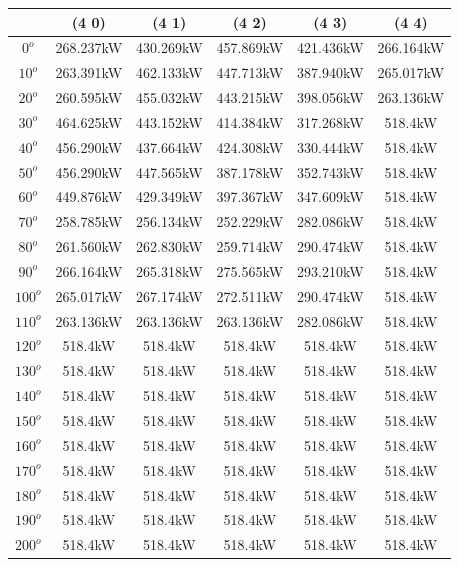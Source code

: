        \begin{table}[H]
        	\centering
        	\begin{tabular}{|c|c|c|c|c|c|} \hline
        			& (4 0)		& (4 1)		& (4 2)		& (4 3)		& (4 4)		\\ \hline
		$0^o$	& 268.237kW	& 430.269kW	& 457.869kW	& 421.436kW	& 266.164kW	\\ \hline
		$10^o$	& 263.391kW	& 462.133kW	& 447.713kW	& 387.940kW	& 265.017kW	\\ \hline
		$20^o$	& 260.595kW	& 455.032kW	& 443.215kW	& 398.056kW	& 263.136kW	\\ \hline
		$30^o$	& 464.625kW	& 443.152kW	& 414.384kW	& 317.268kW	& 518.4kW	\\ \hline
		$40^o$	& 456.290kW	& 437.664kW	& 424.308kW	& 330.444kW	& 518.4kW	\\ \hline
		$50^o$	& 456.290kW	& 447.565kW	& 387.178kW	& 352.743kW	& 518.4kW	\\ \hline
		$60^o$	& 449.876kW	& 429.349kW	& 397.367kW	& 347.609kW	& 518.4kW	\\ \hline
		$70^o$	& 258.785kW	& 256.134kW	& 252.229kW	& 282.086kW	& 518.4kW	\\ \hline
		$80^o$	& 261.560kW	& 262.830kW	& 259.714kW	& 290.474kW	& 518.4kW	\\ \hline
		$90^o$	& 266.164kW	& 265.318kW	& 275.565kW	& 293.210kW	& 518.4kW	\\ \hline
		$100^o$	& 265.017kW	& 267.174kW	& 272.511kW	& 290.474kW	& 518.4kW	\\ \hline
		$110^o$	& 263.136kW	& 263.136kW	& 263.136kW	& 282.086kW	& 518.4kW	\\ \hline
		$120^o$	& 518.4kW	& 518.4kW	& 518.4kW	& 518.4kW	& 518.4kW	\\ \hline
		$130^o$	& 518.4kW	& 518.4kW	& 518.4kW	& 518.4kW	& 518.4kW	\\ \hline
		$140^o$	& 518.4kW	& 518.4kW	& 518.4kW	& 518.4kW	& 518.4kW	\\ \hline
		$150^o$	& 518.4kW	& 518.4kW	& 518.4kW	& 518.4kW	& 518.4kW	\\ \hline
		$160^o$	& 518.4kW	& 518.4kW	& 518.4kW	& 518.4kW	& 518.4kW	\\ \hline
		$170^o$	& 518.4kW	& 518.4kW	& 518.4kW	& 518.4kW	& 518.4kW	\\ \hline
		$180^o$	& 518.4kW	& 518.4kW	& 518.4kW	& 518.4kW	& 518.4kW	\\ \hline
		$190^o$	& 518.4kW	& 518.4kW	& 518.4kW	& 518.4kW	& 518.4kW	\\ \hline
		$200^o$	& 518.4kW	& 518.4kW	& 518.4kW	& 518.4kW	& 518.4kW	\\ \hline

\end{tabular}
\end{table}
